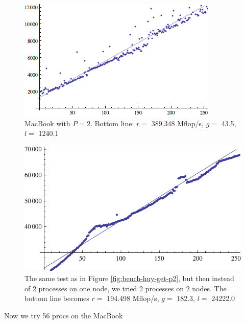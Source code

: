 \documentclass[a4paper]{article}
\begin{document}
\begin{figure}[h]
    \begin{center}
        \includegraphics{img/bench-laptop-get.png}
    \end{center}
    \caption{MacBook with $P=2$. Bottom line: $r=$ 389.348 Mflop/s, $g=$ 43.5, $l=$ 1240.1}
    \label{fig:bench-laptop-get-p2}
\end{figure}

\begin{figure}[h]
    \begin{center}
        \includegraphics{img/bench-huy-get-p2-dist}
    \end{center}
    \caption{The same test as in Figure \ref{fig:bench-huy-get-p2}, but then
    instead of 2 processes on one node, we tried 2 processes on 2 nodes. The
    bottom line becomes $r=$ 194.498 Mflop/s, $g=$ 182.3, $l=$ 24222.0}
    \label{fig:bench-huy-get-p2-dist}
\end{figure}

Now we try 56 procs on the MacBook
\end{document}
